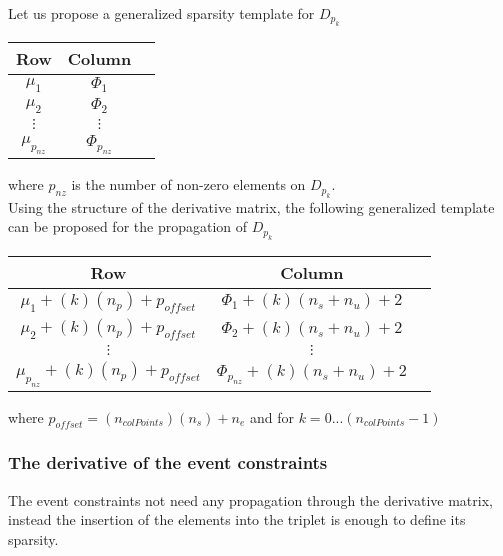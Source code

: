 \documentclass[12pt]{article}
\begin{document}
Let us propose a generalized sparsity template for $D_{p_k}$

\begin{table}[h]
\begin{center}
\begin{tabular}{c|c|c}
Row                 & Column            \\ \hline
$\mu_1$          & $\Phi_1$         \\
$\mu_2$          & $\Phi_2$         \\
$\vdots$            & $\vdots$          \\
$\mu_{p_{nz}}$   & $\Phi_{p_{nz}}$  \\
\end{tabular}
\end{center}
\end{table}

\noindent where $p_{nz}$ is the number of non-zero elements on $D_{p_k}$.\\

\noindent Using the structure of the derivative matrix, the following generalized template can be proposed for the propagation of $D_{p_k}$

\begin{table}[!h]
\begin{center}
\begin{tabular}{c|c|c}
Row                 & Column            \\ \hline
$\mu_1+(k)(n_p)+p_{offset}$          & $\Phi_1+(k)(n_s+n_u)+2$         \\
$\mu_2+(k)(n_p)+p_{offset}$          & $\Phi_2+(k)(n_s+n_u)+2$         \\
$\vdots$            & $\vdots$          \\
$\mu_{p_{nz}}+(k)(n_p)+p_{offset}$   & $\Phi_{p_{nz}}+(k)(n_s+n_u)+2$  \\
\end{tabular}
\end{center}
\end{table}

\noindent where $p_{offset}=(n_{colPoints})(n_s)+n_e$ and for $k=0...(n_{colPoints}-1)$

\subsubsection{The derivative of the event constraints}

The event constraints not need any propagation through the derivative matrix, instead the insertion of the elements into the triplet is enough to define its sparsity.
\end{document}

